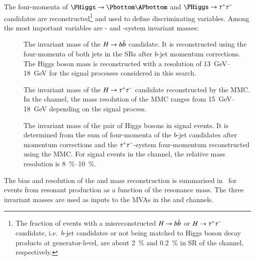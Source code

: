 The four-momenta of $\PHiggs \ra \Pbottom\APbottom$ and $\PHiggs \ra \tautau$
candidates are reconstructed\footnote{The fraction of events with a
  misreconstructed $H \to b\bar{b}$ or $H \to \tau^{+} \tau^{-}$ candidate, i.e.\ $b$-jet
  candidates or \tauhadvis not being matched to Higgs boson decay products at
  generator-level, are about \SI{2}{\percent} and \SI{0.2}{\percent} in SR of
  the \hadhad channel, respectively.}  and used to define discriminating
variables. Among the most important variables are \PHiggs- and \HH-system
invariant masses:
\begin{description}

\item[\mBB] The invariant mass of the $H \to b\bar{b}$ candidate. It is
  reconstructed using the four-momenta of both \btagged jets in the SRs after
  $b$-jet momentum corrections. The Higgs boson mass is reconstructed with a
  resolution of \SIrange{13}{18}{\GeV} for the signal processes considered in
  this search.

\item[\mMMC] The invariant mass of the $H \to \tau^{+} \tau^{-}$ candidate reconstructed
  by the MMC. In the \hadhad channel, the mass resolution of the MMC ranges from
  \SIrange{15}{18}{\GeV} depending on the signal process.

\item[\mHH] The invariant mass of the pair of Higgs bosons in signal events. It
  is determined from the sum of four-momenta of the $b$-jet candidates after
  momentum corrections and the $\tau^{+} \tau^{-}$-system four-momentum reconstructed
  using the MMC. For signal events in the \hadhad channel, the relative mass
  resolution is \SIrange{8}{10}{\percent}.

\end{description}
The bias and resolution of the \PHiggs and \HH mass reconstruction is summarised
in~ for events from resonant \HH production as a
function of the resonance mass. The three invariant masses are used as inputs to
the MVAs in the \hadhad and \lephad channels.


